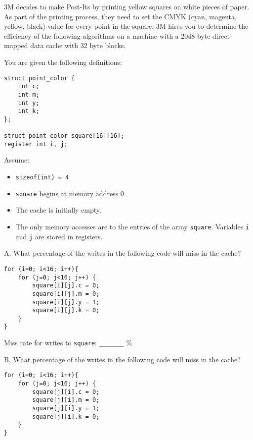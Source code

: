 \begin{problem}{12}

3M decides to make Post-Its by printing yellow squares on white pieces
of paper. As part of the printing process, they need to set the CMYK
(cyan, magenta, yellow, black) value for every point in the square.
3M hires you to determine the efficiency of the following algorithms
on a machine with a 2048-byte direct-mapped data cache with 32 byte blocks.

You are given the following definitions:

\begin{verbatim}
struct point_color {
    int c;
    int m;
    int y;
    int k;
};

struct point_color square[16][16];
register int i, j;

\end{verbatim}

Assume:
\begin{itemize}
\item \verb|sizeof(int) = 4|
\item \verb|square| begins at memory address 0
\item The cache is initially empty.
\item The only memory accesses are to the entries of the array \verb|square|. 
Variables \verb|i| and \verb|j| are stored in registers.
\end{itemize}

\end{problem}

A. What percentage of the writes in the following code will miss in the cache?

\begin{verbatim}
for (i=0; i<16; i++){
    for (j=0; j<16; j++) {
        square[i][j].c = 0;
        square[i][j].m = 0;
        square[i][j].y = 1;
        square[i][j].k = 0;
    }
}
\end{verbatim}


\vspace{0.25in}

Miss rate for writes to {\tt square}: \verb|_______| \%

\vspace{0.25in}

B. What percentage of the writes in the following code will miss in the cache?

\begin{verbatim}
for (i=0; i<16; i++){
    for (j=0; j<16; j++) {
        square[j][i].c = 0;
        square[j][i].m = 0;
        square[j][i].y = 1;
        square[j][i].k = 0;
    }
}
\end{verbatim}

